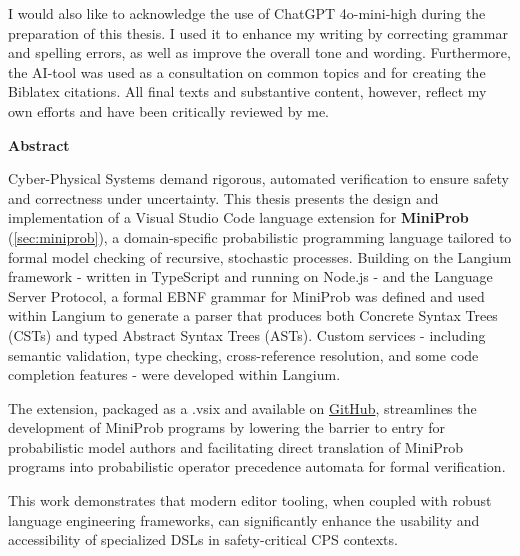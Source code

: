 \documentclass[11pt]{report}
\begin{document}
\noindent I would also like to acknowledge the use of ChatGPT 4o-mini-high during the preparation of this thesis. I used it to enhance my writing by correcting grammar
and spelling errors, as well as improve the overall tone and wording.
Furthermore, the AI-tool was used as a consultation on common topics and for creating the Biblatex citations.
All final texts and substantive content, however, reflect my own efforts and have been critically reviewed by me.


\cleardoublepage
\begin{flushright}
  {\Huge\bfseries Abstract\par}
\end{flushright}
\vspace*{3cm}

\noindent
Cyber-Physical Systems demand rigorous, automated verification to ensure safety and correctness under uncertainty. This thesis presents the design and implementation of
a Visual Studio Code language extension for \textbf{MiniProb} (\ref{sec:miniprob}), a domain-specific probabilistic programming language tailored to formal model
checking of recursive, stochastic processes. Building on the Langium framework - written in TypeScript and running on Node.js - and the Language Server Protocol,
a formal EBNF grammar for MiniProb was defined and used within Langium to generate a parser that produces both Concrete Syntax Trees (CSTs) and
typed Abstract Syntax Trees (ASTs). Custom services - including semantic validation, type checking, cross-reference resolution, and some code completion features -
were developed within Langium.

\vspace{1ex}

\noindent
The extension, packaged as a .vsix and available on \hyperlink{https://github.com/e12224207/miniprob}{GitHub}, streamlines the development of MiniProb programs 
by lowering the barrier to entry for probabilistic model authors and facilitating direct translation of MiniProb programs into probabilistic operator precedence
automata for formal verification.

\vspace{1ex}

\noindent
This work demonstrates that modern editor tooling, when coupled with robust language engineering frameworks, can significantly enhance the usability and accessibility
of specialized DSLs in safety-critical CPS contexts.
\end{document}
